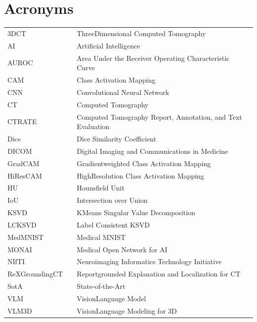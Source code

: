 ﻿\chapter*{Acronyms}

\noindent \begin{tabular}{lcl}
3DCT &  & ThreeDimensional Computed Tomography\\
AI &  & Artificial Intelligence\\
AUROC &  & Area Under the Receiver Operating Characteristic Curve\\
CAM &  & Class Activation Mapping\\
CNN &  & Convolutional Neural Network\\
CT &  & Computed Tomography\\
CTRATE &  & Computed Tomography Report, Annotation, and Text Evaluation\\
Dice &  & Dice Similarity Coefficient\\
DICOM &  & Digital Imaging and Communications in Medicine\\
GradCAM &  & Gradientweighted Class Activation Mapping\\
HiResCAM &  & HighResolution Class Activation Mapping\\
HU &  & Hounsfield Unit\\
IoU &  & Intersection over Union\\
KSVD &  & KMeans Singular Value Decomposition\\
LCKSVD &  & Label Consistent KSVD\\
MedMNIST &  & Medical MNIST\\
MONAI &  & Medical Open Network for AI\\
NIfTI &  & Neuroimaging Informatics Technology Initiative\\
ReXGroundingCT &  & Reportgrounded Explanation and Localization for CT\\
SotA &  & State-of-the-Art\\
VLM &  & VisionLanguage Model\\
VLM3D &  & VisionLanguage Modeling for 3D\\
\end{tabular} 



